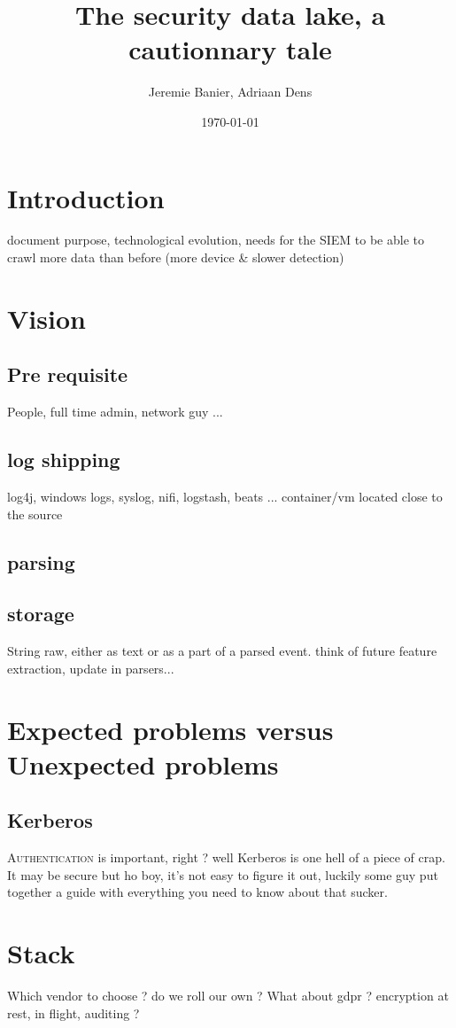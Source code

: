 \documentclass[a4paper,12pt]{article}
\begin{document}
\title{The security data lake, a cautionnary tale}
\author{Jeremie Banier, Adriaan Dens}
\date{\today}
\maketitle
\tableofcontents
\section{Introduction}
document purpose, technological evolution, needs for the SIEM to be able to crawl 
more data than before (more device & slower detection)
\section{Vision}
\subsection{Pre requisite}
People, full time admin, network guy ...
\subsection{log shipping}
log4j, windows logs, syslog, nifi, logstash, beats ...
container/vm located close to the source
\subsection{parsing}
\subsection{storage}
String raw, either as text or as a part of a parsed event. think of future feature extraction, update in parsers...
\section{Expected problems versus Unexpected problems}
\subsection{Kerberos}
\lettrine{A}{uthentication} is important, right ? well Kerberos is one hell of a piece of crap.
It may be secure but ho boy, it's not easy to figure it out, luckily some guy put together a guide with everything you need to know about that sucker.
\section{Stack}
Which vendor to choose ? do we roll our own ? 
What about gdpr ? encryption at rest, in flight, auditing ? 
\end{document}
